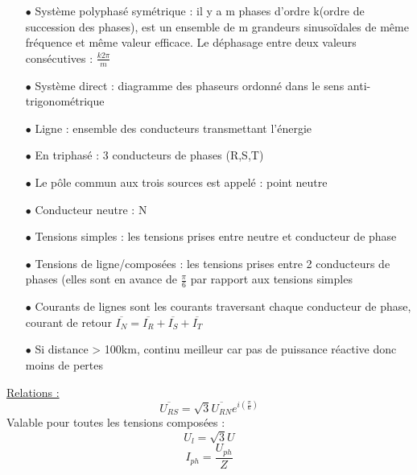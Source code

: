 \documentclass[../main.tex]{subfiles}
\begin{document}
\begin{itemize}
    \item[$\bullet$] Système polyphasé symétrique : il y a m phases d'ordre k(ordre de succession des phases), est un ensemble de m grandeurs sinusoïdales de même fréquence et même valeur efficace. Le déphasage entre deux valeurs consécutives : $\frac{k2\pi}{m}$\\
    \item[$\bullet$] Système direct : diagramme des phaseurs ordonné dans le sens anti-trigonométrique\\
    \item[$\bullet$] Ligne : ensemble des conducteurs transmettant l'énergie\\
    \item[$\bullet$] En triphasé : 3 conducteurs de phases (R,S,T)\\
    \item[$\bullet$]Le pôle commun aux trois sources est appelé : point neutre\\
    \item[$\bullet$] Conducteur neutre : N\\
    \item[$\bullet$] Tensions simples : les tensions prises entre neutre et conducteur de phase\\
    \item[$\bullet$] Tensions de ligne/composées : les tensions prises entre 2 conducteurs de phases (elles sont en avance de $\frac{\pi}{6}$ par rapport aux tensions simples\\
    \item[$\bullet$] Courants de lignes sont les courants traversant chaque conducteur de phase, courant de retour $ \overline{I_N} = \overline{I_R} + \overline{I_S} + \overline{I_T}$
    \item[$\bullet$] Si distance > 100km, continu meilleur car pas de puissance réactive donc moins de pertes
\end{itemize}

\quad \underline{Relations :}\\
\begin{equation}
\overline{U_{RS}} = \sqrt{3}\overline{U_{RN}}e^{i(\frac{\pi}{6})}
\end{equation}
Valable pour toutes les tensions composées : 
\begin{equation}
    U_l = \sqrt{3}U
\end{equation}
\begin{equation}
    I_{ph} = \frac{U_{ph}}{Z}
\end{equation}
\end{document}
